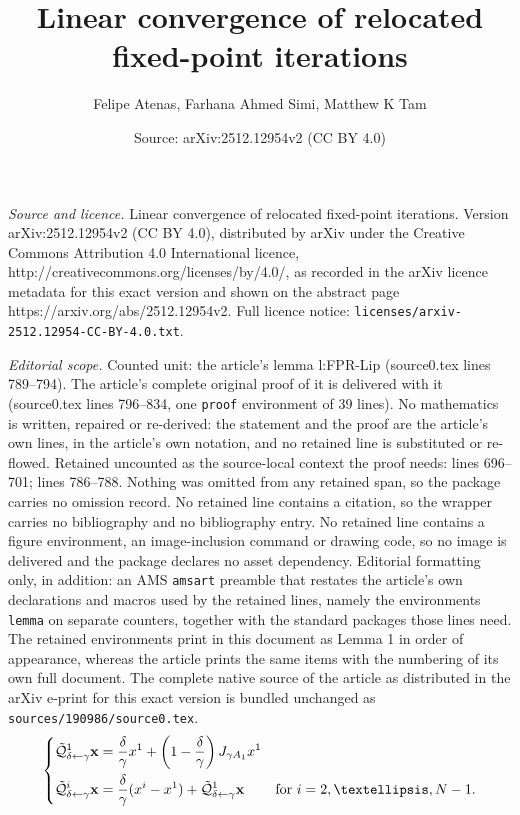 \documentclass[10pt,a4paper]{amsart}
\title{Linear convergence of relocated fixed-point iterations}
\author{Felipe Atenas, Farhana Ahmed Simi, Matthew K Tam}
\date{Source: arXiv:2512.12954v2 (CC BY 4.0)}
\begin{document}
\maketitle

\noindent\emph{Source and licence.} Linear convergence of relocated fixed-point iterations. Version arXiv:2512.12954v2 (CC BY 4.0), distributed by arXiv under the Creative Commons Attribution 4.0 International licence, http://creativecommons.org/licenses/by/4.0/, as recorded in the arXiv licence metadata for this exact version and shown on the abstract page https://arxiv.org/abs/2512.12954v2. Full licence notice: \texttt{licenses/arxiv-2512.12954-CC-BY-4.0.txt}.\par\smallskip

\noindent\textit{Editorial scope.} Counted unit: the article's lemma l:FPR-Lip (source0.tex lines 789--794). The article's complete original proof of it is delivered with it (source0.tex lines 796--834, one \texttt{proof} environment of 39 lines). No mathematics is written, repaired or re-derived: the statement and the proof are the article's own lines, in the article's own notation, and no retained line is substituted or re-flowed.  Retained uncounted as the source-local context the proof needs: lines 696--701; lines 786--788.  Nothing was omitted from any retained span, so the package carries no omission record.  No retained line contains a citation, so the wrapper carries no bibliography and no bibliography entry.  No retained line contains a figure environment, an image-inclusion command or drawing code, so no image is delivered and the package declares no asset dependency.  Editorial formatting only, in addition: an AMS \texttt{amsart} preamble that restates the article's own declarations and macros used by the retained lines, namely the environments \texttt{lemma} on separate counters, together with the standard packages those lines need.  The retained environments print in this document as Lemma 1 in order of appearance, whereas the article prints the same items with the numbering of its own full document.  The complete native source of the article as distributed in the arXiv e-print for this exact version is bundled unchanged as \texttt{sources/190986/source0.tex}.
\begin{equation}\label{relocator of MT}
    \left\{\begin{aligned}
        \mathcal{\Tilde{Q}}^1_{\delta\leftarrow\gamma}\mathbf{x}&=\frac{\delta}{\gamma}x^1+\left(1-\frac{\delta}{\gamma}\right)J_{\gamma A_1}x^1 &&\\
        \mathcal{\Tilde{Q}}^i_{\delta\leftarrow\gamma} \mathbf{x}&=\frac{\delta}{\gamma}(x^i-x^1)+\mathcal{\Tilde{Q}}^1_{\delta\leftarrow\gamma}\mathbf{x} &&\text{for~}i=2,\dots,N-1.
    \end{aligned}\right.
\end{equation}
\end{document}
